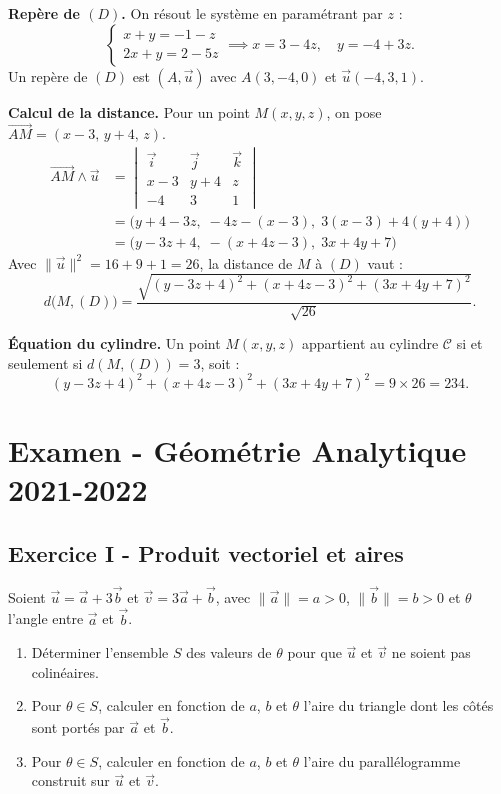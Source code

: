 \documentclass[12pt,a4paper]{article}
\begin{document}
\begin{boitecorrige}
\textbf{Repère de $(D)$.}
On résout le système en paramétrant par $z$ :
\[
  \begin{cases} x+y = -1-z \\ 2x+y = 2-5z \end{cases}
  \implies x = 3-4z, \quad y = -4+3z.
\]
Un repère de $(D)$ est $(A, \vec{u})$ avec $A(3,-4,0)$ et $\vec{u}(-4,3,1)$.

\textbf{Calcul de la distance.}
Pour un point $M(x,y,z)$, on pose $\overrightarrow{AM} = (x-3,\, y+4,\, z)$.
\begin{align*}
  \overrightarrow{AM}\wedge\vec{u} &=
  \begin{vmatrix}\vec{i}&\vec{j}&\vec{k}\\x-3&y+4&z\\-4&3&1\end{vmatrix}\\
  &= \bigl(y+4-3z,\;-4z-(x-3),\;3(x-3)+4(y+4)\bigr)\\
  &= \bigl(y-3z+4,\;-(x+4z-3),\;3x+4y+7\bigr)
\end{align*}
Avec $\|\vec{u}\|^2 = 16+9+1 = 26$, la distance de $M$ à $(D)$ vaut :
\[
  \boxed{d\bigl(M,(D)\bigr) = \frac{\sqrt{(y-3z+4)^2+(x+4z-3)^2+(3x+4y+7)^2}}{\sqrt{26}}.}
\]

\textbf{Équation du cylindre.}
Un point $M(x,y,z)$ appartient au cylindre $\mathcal{C}$ si et seulement si $d(M,(D))=3$, soit :
\[
  (y-3z+4)^2 + (x+4z-3)^2 + (3x+4y+7)^2 = 9\times 26 = 234.
\]
\end{boitecorrige}

\newpage
\section{Examen - Géométrie Analytique 2021-2022}

\subsection*{Exercice I - Produit vectoriel et aires \niveau{\moyen}}

\begin{boiteexercice}
Soient $\vec{u} = \vec{a}+3\vec{b}$ et $\vec{v} = 3\vec{a}+\vec{b}$, avec $\|\vec{a}\|=a>0$,
$\|\vec{b}\|=b>0$ et $\theta$ l'angle entre $\vec{a}$ et $\vec{b}$.
\begin{enumerate}
  \item Déterminer l'ensemble $S$ des valeurs de $\theta$ pour que $\vec{u}$ et $\vec{v}$ ne soient
    pas colinéaires.
  \item Pour $\theta\in S$, calculer en fonction de $a$, $b$ et $\theta$ l'aire du triangle dont les
    côtés sont portés par $\vec{a}$ et $\vec{b}$.
  \item Pour $\theta\in S$, calculer en fonction de $a$, $b$ et $\theta$ l'aire du parallélogramme
    construit sur $\vec{u}$ et $\vec{v}$.
\end{enumerate}
\end{boiteexercice}
\end{document}
